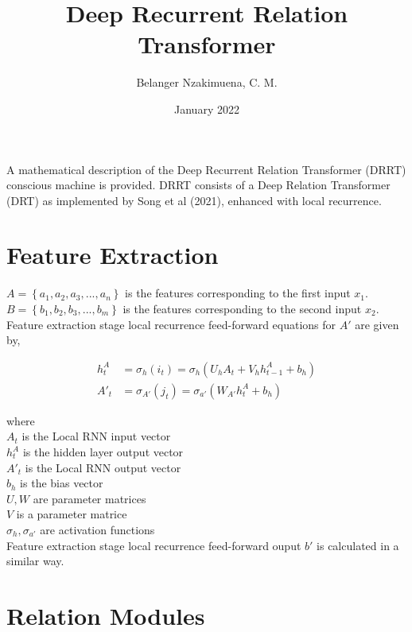 \documentclass{article}
\title{Deep Recurrent Relation Transformer}
\author{Belanger Nzakimuena, C. M.}
\date{January 2022}
\begin{document}
\maketitle

\noindent A mathematical description of the Deep Recurrent Relation Transformer (DRRT) conscious machine is provided.  DRRT consists of a Deep Relation Transformer (DRT) as implemented by Song et al (2021), enhanced with local recurrence.

\section{Feature Extraction}

\noindent $A = \left\{a_{1}, a_{2}, a_{3}, ..., a_{n}\right\}$ is the features corresponding to the first input $x_{1}$. \\
\noindent $B = \left\{b_{1}, b_{2}, b_{3}, ..., b_{m}\right\}$ is the features corresponding to the second input $x_{2}$. \\

\noindent Feature extraction stage local recurrence feed-forward equations for $A'$ are given by,

\begin{align}
h_{t}^{A} &= \sigma_{h}(i_{t}) = \sigma_{h}(U_{h}A_{t}+V_{h}h_{t-1}^{A}+b_{h}) \\
A'_{t} &= \sigma_{A'}(j_{t}) = \sigma_{a'}(W_{A'}h_{t}^{A}+b_{h})
\end{align}

where \\

\indent\indent $A_{t}$ is the Local RNN input vector \\
\indent\indent $h_{t}^{A}$ is the hidden layer output vector \\
\indent\indent $A'_{t}$ is the Local RNN output vector \\
\indent\indent $b_{h}$ is the bias vector \\
\indent\indent $U, W$ are parameter matrices \\
\indent\indent $V$ is a parameter matrice \\
\indent\indent $\sigma_{h}, \sigma_{a'}$ are activation functions \\

\noindent Feature extraction stage local recurrence feed-forward ouput $b'$ is calculated in a similar way.

\section{Relation Modules}
\end{document}
